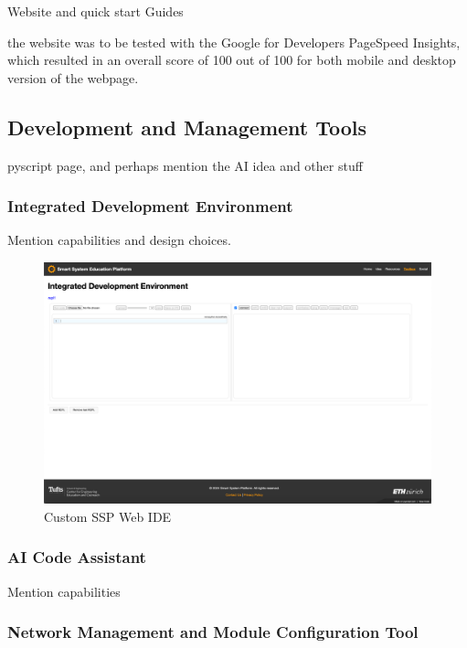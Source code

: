 Website and quick start Guides

the website was to be tested with the Google for Developers PageSpeed Insights, which resulted in an overall score of 100 out of 100 for both mobile and desktop version of the webpage.

\subsection{\label{sec:res_tools}Development and Management Tools}

pyscript page, and perhaps mention the AI idea and other stuff

\subsubsection{\label{sec:res_ide}Integrated Development Environment}

Mention capabilities and design choices. 

\begin{figure}[H]
    \centering
    \includegraphics[width=\linewidth]{overleaf/images/ide_raw.png}
    \vspace{\ftspace}
    \caption{Custom SSP Web IDE}
    \vspace{\ftspace}
    \label{fig:ide_raw}
\end{figure}

\subsubsection{\label{sec:res_ai_code}AI Code Assistant}

Mention capabilities

\subsubsection{\label{sec:res_nmmct}Network Management and Module Configuration Tool}

